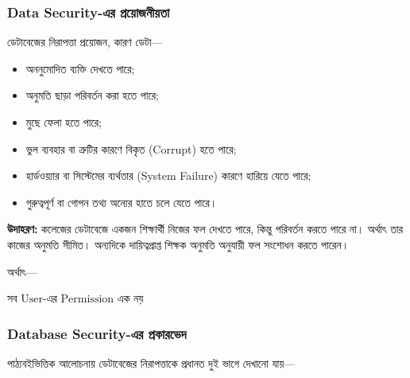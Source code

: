 \subsubsection{Data Security-এর প্রয়োজনীয়তা}

\begin{chSixSideBySide}[.48]
ডেটাবেজের নিরাপত্তা প্রয়োজন, কারণ ডেটা---

\begin{itemize}
    \item অননুমোদিত ব্যক্তি দেখতে পারে;
    \item অনুমতি ছাড়া পরিবর্তন করা হতে পারে;
    \item মুছে ফেলা হতে পারে;
    \item ভুল ব্যবহার বা ত্রুটির কারণে বিকৃত (Corrupt) হতে পারে;
    \item হার্ডওয়্যার বা সিস্টেমের ব্যর্থতার (System Failure) কারণে হারিয়ে যেতে পারে;
    \item গুরুত্বপূর্ণ বা গোপন তথ্য অন্যের হাতে চলে যেতে পারে।
\end{itemize}
\chSixNextColumn
\noindent
\textbf{উদাহরণ:}
কলেজের ডেটাবেজে একজন শিক্ষার্থী নিজের ফল দেখতে পারে, কিন্তু পরিবর্তন করতে পারে না। অর্থাৎ তার কাজের অনুমতি সীমিত। অন্যদিকে দায়িত্বপ্রাপ্ত শিক্ষক অনুমতি অনুযায়ী ফল সংশোধন করতে পারেন।

অর্থাৎ---

\par\smallskip
\noindent\(\displaystyle \boxed{\text{সব User-এর Permission এক নয়}}\)\par\smallskip
\end{chSixSideBySide}

\subsubsection{Database Security-এর প্রকারভেদ}

পাঠ্যবইভিত্তিক আলোচনায় ডেটাবেজের নিরাপত্তাকে প্রধানত দুই ভাগে
দেখানো যায়---

\begin{flushleft}
\begin{minipage}{0.92\linewidth}
\raggedright
\small



\end{minipage}
\end{flushleft}


